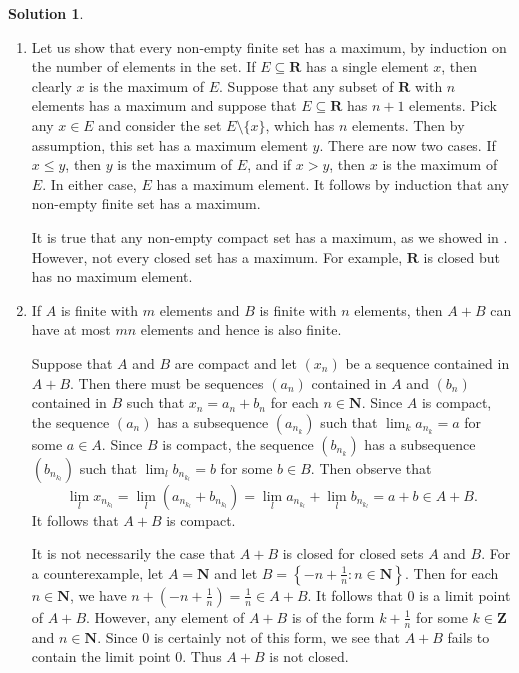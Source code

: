 \documentclass[12pt]{article}
\theoremstyle{definition}
\theoremstyle{exercise}
\theoremstyle{solution}
\newtheorem*{solution}{Solution}
\newcommand{\N}{\mathbf{N}}
\newcommand{\Z}{\mathbf{Z}}
\newcommand{\R}{\mathbf{R}}
\begin{document}
\begin{solution}
    \begin{enumerate}
        \item Let us show that every non-empty finite set has a maximum, by induction on the number of elements in the set. If \( E \subseteq \R \) has a single element \( x \), then clearly \( x \) is the maximum of \( E \). Suppose that any subset of \( \R \) with \( n \) elements has a maximum and suppose that \( E \subseteq \R \) has \( n + 1 \) elements. Pick any \( x \in E \) and consider the set \( E \setminus \{ x \} \), which has \( n \) elements. Then by assumption, this set has a maximum element \( y \). There are now two cases. If \( x \leq y \), then \( y \) is the maximum of \( E \), and if \( x > y \), then \( x \) is the maximum of \( E \). In either case, \( E \) has a maximum element. It follows by induction that any non-empty finite set has a maximum.

        It is true that any non-empty compact set has a maximum, as we showed in . However, not every closed set has a maximum. For example, \( \R \) is closed but has no maximum element.

        \item If \( A \) is finite with \( m \) elements and \( B \) is finite with \( n \) elements, then \( A + B \) can have at most \( mn \) elements and hence is also finite.

        Suppose that \( A \) and \( B \) are compact and let \( (x_n) \) be a sequence contained in \( A + B \). Then there must be sequences \( (a_n) \) contained in \( A \) and \( (b_n) \) contained in \( B \) such that \( x_n = a_n + b_n \) for each \( n \in \N \). Since \( A \) is compact, the sequence \( (a_n) \) has a subsequence \( (a_{n_k}) \) such that \( \lim_k a_{n_k} = a \) for some \( a \in A \). Since \( B \) is compact, the sequence \( (b_{n_k}) \) has a subsequence \( (b_{n_{k_l}}) \) such that \( \lim_l b_{n_{k_l}} = b \) for some \( b \in B \). Then observe that
        \[
            \lim_l x_{n_{k_l}} = \lim_l \left( a_{n_{k_l}} + b_{n_{k_l}} \right) = \lim_l a_{n_{k_l}} + \lim_l b_{n_{k_l}} = a + b \in A + B.
        \]
        It follows that \( A + B \) is compact.

        It is not necessarily the case that \( A + B \) is closed for closed sets \( A \) and \( B \). For a counterexample, let \( A = \N \) and let \( B = \left\{ -n + \tfrac{1}{n} : n \in \N \right\} \). Then for each \( n \in \N \), we have \( n + \left( -n + \tfrac{1}{n} \right) = \tfrac{1}{n} \in A + B \). It follows that 0 is a limit point of \( A + B \). However, any element of \( A + B \) is of the form \( k + \tfrac{1}{n} \) for some \( k \in \Z \) and \( n \in \N \). Since 0 is certainly not of this form, we see that \( A + B \) fails to contain the limit point 0. Thus \( A + B \) is not closed.


\end{enumerate}
\end{solution}
\end{document}
